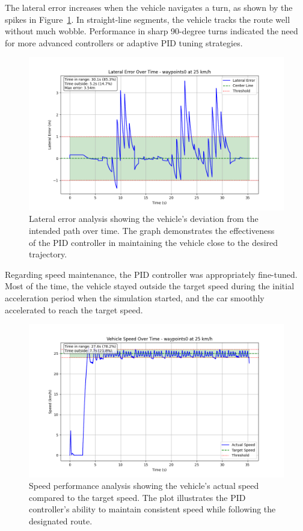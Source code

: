 \documentclass[conference]{IEEEtran}
\begin{document}
The lateral error increases when the vehicle navigates a turn, as shown by the spikes in Figure~\ref{fig:lateral_error}. In straight-line segments, the vehicle tracks the route well without much wobble. Performance in sharp 90-degree turns indicated the need for more advanced controllers or adaptive PID tuning strategies.

\begin{figure}[h]
    \centering
    \includegraphics[width=\columnwidth]{Plots/lateral_error_waypoints0_25kmh.png}
    \caption{Lateral error analysis showing the vehicle's deviation from the intended path over time. The graph demonstrates the effectiveness of the PID controller in maintaining the vehicle close to the desired trajectory.}
    \label{fig:lateral_error}
\end{figure}

Regarding speed maintenance, the PID controller was appropriately fine-tuned. Most of the time, the vehicle stayed outside the target speed during the initial acceleration period when the simulation started, and the car smoothly accelerated to reach the target speed.

\begin{figure}[h]
    \centering
    \includegraphics[width=\columnwidth]{Plots/speed_performance_waypoints0_25kmh.png}
    \caption{Speed performance analysis showing the vehicle's actual speed compared to the target speed. The plot illustrates the PID controller's ability to maintain consistent speed while following the designated route.}
    \label{fig:speed_performance}
\end{figure}
\end{document}
